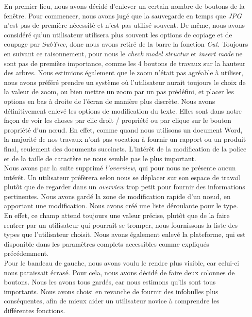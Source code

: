 \documentclass[12pt, a4paper]{article}
\begin{document}
En premier lieu, nous avons décidé d'enlever un certain nombre de boutons de la fenêtre. Pour commencer, nous avons jugé que la sauvegarde en temps que \emph{JPG} n'est pas de première nécessité et n'est pas utilisé souvent. De même, nous avons considéré qu'un utilisateur utilisera plus souvent les options de copiage et de coupage par \emph{SubTree}, donc nous avons retiré de la barre la fonction \emph{Cut}. Toujours en suivant ce raisonnement, pour nous le \emph{check model structur} et \emph{insert mode} ne sont pas de première importance, comme les 4 boutons de travaux sur la hauteur des arbres. Nous estimions également que le zoom n'était pas agréable à utiliser, nous avons préféré prendre un système où l'utilisateur aurait toujours le choix de la valeur de zoom, ou bien mettre un zoom par un pas prédéfini, et placer les options en bas à droite de l'écran de manière plus discrète. Nous avons définitivement enlevé les options de modification du texte. Elles sont dans notre façon de voir les choses par clic droit / propriété ou par clique sur le bouton propriété d'un nœud. En effet, comme quand nous utilisons un document Word, la majorité de nos travaux n'ont pas vocation à fournir un rapport ou un produit final, seulement des documents succincts. L’intérêt de la modification de la police et de la taille de caractère ne nous semble pas le plus important.\\


Nous avons par la suite supprimé \emph{l'overview}, qui pour nous ne présente aucun intérêt. Un utilisateur préfèrera selon nous se déplacer sur son espace de travail plutôt que de regarder dans un \emph{overview} trop petit pour fournir des informations pertinentes. Nous avons gardé la zone de modification rapide d'un nœud, en apportant une modification. Nous avons créé une liste déroulante pour le type. En effet, ce champ attend toujours une valeur précise, plutôt que de la faire rentrer par un utilisateur qui pourrait se tromper, nous fournissons la liste des types que l'utilisateur choisit. Nous avons également enlevé la plateforme, qui est disponible dans les paramètres complets accessibles comme expliqués précédemment.\\



Pour le bandeau de gauche, nous avons voulu le rendre plus visible, car celui-ci nous paraissait écrasé. Pour cela, nous avons décidé de faire deux colonnes de boutons. Nous les avons tous gardés, car nous estimons qu'ils sont tous importants. Nous avons choisi en revanche de fournir des infobulles plus conséquentes, afin de mieux aider un utilisateur novice à comprendre les différentes fonctions.\\
\end{document}
